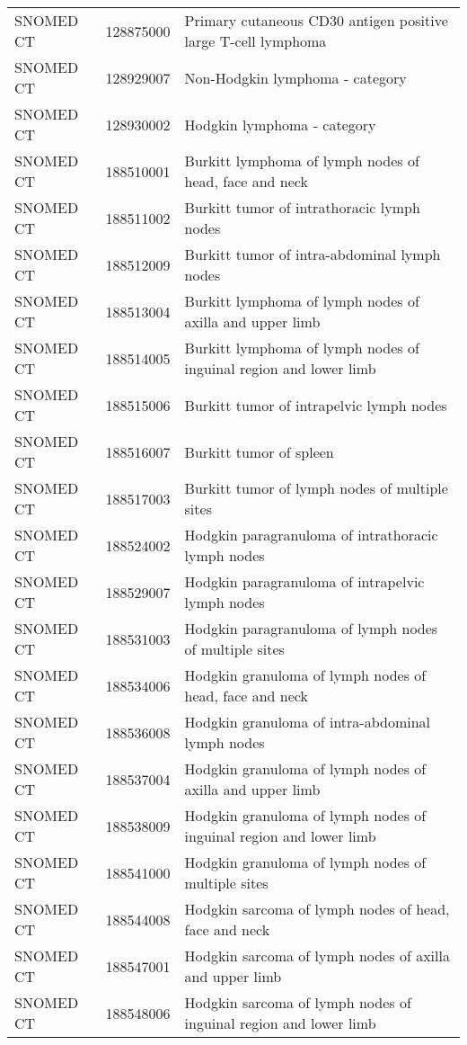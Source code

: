 \begin{table}[ht]
\begin{tabular}{lll}
  SNOMED CT & 128875000 & Primary cutaneous CD30 antigen positive large T-cell lymphoma \\ 
  SNOMED CT & 128929007 & Non-Hodgkin lymphoma - category \\ 
  SNOMED CT & 128930002 & Hodgkin lymphoma - category \\ 
  SNOMED CT & 188510001 & Burkitt lymphoma of lymph nodes of head, face and neck \\ 
  SNOMED CT & 188511002 & Burkitt tumor of intrathoracic lymph nodes \\ 
  SNOMED CT & 188512009 & Burkitt tumor of intra-abdominal lymph nodes \\ 
  SNOMED CT & 188513004 & Burkitt lymphoma of lymph nodes of axilla and upper limb \\ 
  SNOMED CT & 188514005 & Burkitt lymphoma of lymph nodes of inguinal region and lower limb \\ 
  SNOMED CT & 188515006 & Burkitt tumor of intrapelvic lymph nodes \\ 
  SNOMED CT & 188516007 & Burkitt tumor of spleen \\ 
  SNOMED CT & 188517003 & Burkitt tumor of lymph nodes of multiple sites \\ 
  SNOMED CT & 188524002 & Hodgkin paragranuloma of intrathoracic lymph nodes \\ 
  SNOMED CT & 188529007 & Hodgkin paragranuloma of intrapelvic lymph nodes \\ 
  SNOMED CT & 188531003 & Hodgkin paragranuloma of lymph nodes of multiple sites \\ 
  SNOMED CT & 188534006 & Hodgkin granuloma of lymph nodes of head, face and neck \\ 
  SNOMED CT & 188536008 & Hodgkin granuloma of intra-abdominal lymph nodes \\ 
  SNOMED CT & 188537004 & Hodgkin granuloma of lymph nodes of axilla and upper limb \\ 
  SNOMED CT & 188538009 & Hodgkin granuloma of lymph nodes of inguinal region and lower limb \\ 
  SNOMED CT & 188541000 & Hodgkin granuloma of lymph nodes of multiple sites \\ 
  SNOMED CT & 188544008 & Hodgkin sarcoma of lymph nodes of head, face and neck \\ 
  SNOMED CT & 188547001 & Hodgkin sarcoma of lymph nodes of axilla and upper limb \\ 
  SNOMED CT & 188548006 & Hodgkin sarcoma of lymph nodes of inguinal region and lower limb \\ 

\end{tabular}
\end{table}
